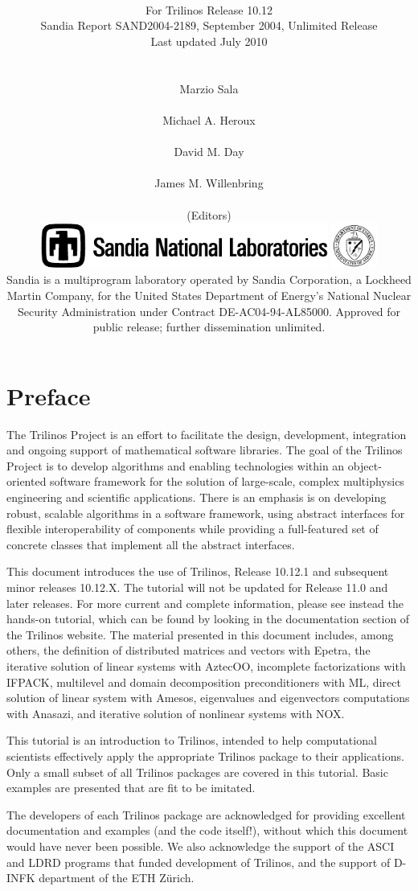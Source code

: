 \documentclass[final]{colabarticle}
\title{\textbf{\resizebox{10cm}{!}{Trilinos Tutorial}}\vspace{5mm}}
\subtitle{
  \\
  \vspace*{4mm}
  \Large For Trilinos Release 10.12 \\
  \vspace*{5mm}
  \noindent
  Sandia Report SAND2004-2189,
  September 2004,
  Unlimited Release \\
  \vspace*{5mm}
  \noindent
  Last updated July 2010 \\
\vspace{6cm}\\
\\ \vspace{0mm}
\hspace*{1cm} Marzio Sala \\
\\ \vspace{0mm}
\hspace*{1cm} Michael A. Heroux\\
\\ \vspace{0mm}
\hspace*{1cm} David M. Day\\
\\ \vspace{0mm}
\hspace*{1cm} James M. Willenbring\\
\\ \vspace{0mm}
\hspace*{1cm} \normalsize (Editors) \\
\vspace*{1cm}
\vfill
\includegraphics[height=1.5cm]{snllineblk}  \hfill
\includegraphics[height=1.5cm]{DOEbwlogo}  \\
Sandia is a multiprogram laboratory operated by Sandia Corporation,
a Lockheed Martin Company, for the United States Department of Energy's
National Nuclear Security Administration under Contract DE-AC04-94-AL85000.
Approved for public release; further dissemination unlimited.
}
\newcommand{\Trilinos}{Trilinos}
\begin{document}
\maketitle

\chapter*{Preface}
  The Trilinos Project is an effort to facilitate the design,
  development, integration and ongoing support of mathematical software
  libraries.  The goal of the Trilinos Project is to develop algorithms
  and enabling technologies within an object-oriented software
  framework for the solution of large-scale, complex multiphysics
  engineering and scientific applications. There is an emphasis is on 
  developing robust, scalable algorithms in a software framework, using
  abstract interfaces for flexible interoperability of components while
  providing a full-featured set of concrete classes that implement all
  the abstract interfaces.

  \medskip

  This document introduces the use of \Trilinos{}, Release 10.12.1 and
  subsequent minor releases 10.12.X.  The tutorial will not be updated for
  Release 11.0 and later releases.  For more current and complete information,
  please see instead the hands-on tutorial, which can be found by looking in
  the documentation section of the Trilinos website.  The material presented
  in this document includes, among others, the definition of
  distributed matrices and vectors with Epetra, the iterative solution
  of linear systems with AztecOO, incomplete factorizations with IFPACK,
  multilevel and domain decomposition preconditioners with ML, direct
  solution of linear system with Amesos,
  eigenvalues and eigenvectors computations with Anasazi,
  and iterative solution of nonlinear systems with NOX.

  This tutorial is an introduction to Trilinos, intended to help
  computational scientists effectively apply the appropriate Trilinos
  package to their applications. Only a small subset of all Trilinos 
  packages are covered in this tutorial. Basic examples are presented
  that are fit to be imitated.

  \bigskip

  The developers of each Trilinos package are acknowledged for providing
  excellent documentation and examples (and the code itself!),
  without which this document would have never been possible.  We also
  acknowledge the support of the ASCI and LDRD programs that funded
  development of Trilinos, and the support of D-INFK department of the ETH
  Z\"urich.
\end{document}
